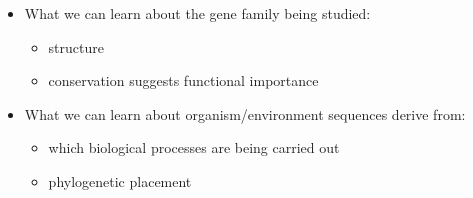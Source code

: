 \documentclass[landscape]{slides}
\begin{document}
\begin{slide}
\end{slide}
\begin{slide}


\small
\begin{itemize}
\item What we can learn about the gene family being studied:
\begin{itemize}
  \item structure
  \item conservation suggests functional importance
\end{itemize}

\item What we can learn about organism/environment sequences derive
  from:
\begin{itemize}
  \item which biological processes are being carried out
  \item phylogenetic placement
\end{itemize}
\end{itemize}

\vfill
\end{slide}
\end{document}
